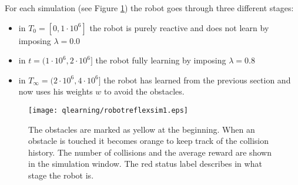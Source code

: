 For each simulation (see Figure \ref{fig:qlearning:robot-sim1}) the robot goes
through three different stages:
\begin{itemize}
 \item in $T_0=[0,1\cdot 10^6]$ the robot is purely reactive and does not learn by
imposing $\lambda=0.0$
 \item in $t=(1\cdot  10^6, 2 \cdot  10^6]$ the robot fully learning by
imposing $\lambda=0.8$
 \item in $T_\infty=(2 \cdot  10^6, 4 \cdot  10^6]$ the robot has learned from the previous
section and now uses his weights $w$ to avoid the obstacles.
\end{itemize}

\begin{figure}[tbp]
\begin{center}
\texttt{[image: qlearning/robotreflexsim1.eps]}
\end{center}
\small{
\caption[Q learning environment]{The obstacles are marked as yellow at the beginning.
When an obstacle is touched it becomes orange to keep track of the collision history.
The number of collisions and the average reward are shown in the simulation window.
The red status label describes in what stage the robot is.
 \label{fig:qlearning:robot-sim1}}}
\end{figure}

